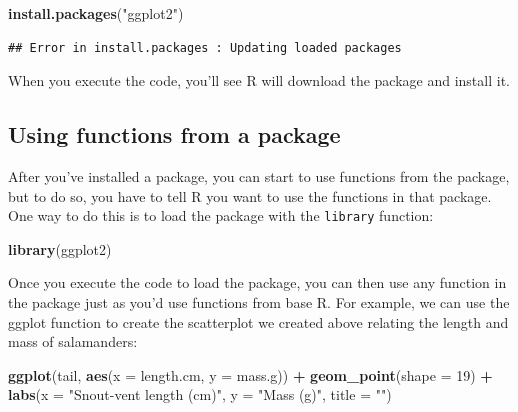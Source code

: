 \documentclass[
]{book}
\newenvironment{Shaded}{\begin{snugshade}}{\end{snugshade}}
\newcommand{\AttributeTok}[1]{\textcolor[rgb]{0.13,0.29,0.53}{#1}}
\newcommand{\DecValTok}[1]{\textcolor[rgb]{0.00,0.00,0.81}{#1}}
\newcommand{\FunctionTok}[1]{\textcolor[rgb]{0.13,0.29,0.53}{\textbf{#1}}}
\newcommand{\NormalTok}[1]{#1}
\newcommand{\SpecialCharTok}[1]{\textcolor[rgb]{0.81,0.36,0.00}{\textbf{#1}}}
\newcommand{\StringTok}[1]{\textcolor[rgb]{0.31,0.60,0.02}{#1}}
\begin{document}
\begin{Shaded}
\begin{Highlighting}[]
\FunctionTok{install.packages}\NormalTok{(}\StringTok{"ggplot2"}\NormalTok{)}
\end{Highlighting}
\end{Shaded}

\begin{verbatim}
## Error in install.packages : Updating loaded packages
\end{verbatim}

When you execute the code, you'll see R will download the package and install it.

\subsection{Using functions from a package}\label{using-functions-from-a-package}

After you've installed a package, you can start to use functions from the package, but to do so, you have to tell R you want to use the functions in that package. One way to do this is to load the package with the \texttt{library} function:

\begin{Shaded}
\begin{Highlighting}[]
\FunctionTok{library}\NormalTok{(ggplot2)}
\end{Highlighting}
\end{Shaded}

Once you execute the code to load the package, you can then use any function in the package just as you'd use functions from base R. For example, we can use the ggplot function to create the scatterplot we created above relating the length and mass of salamanders:

\begin{Shaded}
\begin{Highlighting}[]
\FunctionTok{ggplot}\NormalTok{(tail, }\FunctionTok{aes}\NormalTok{(}\AttributeTok{x =}\NormalTok{ length.cm, }\AttributeTok{y =}\NormalTok{ mass.g)) }\SpecialCharTok{+}
  \FunctionTok{geom\_point}\NormalTok{(}\AttributeTok{shape =} \DecValTok{19}\NormalTok{) }\SpecialCharTok{+}
  \FunctionTok{labs}\NormalTok{(}\AttributeTok{x =} \StringTok{"Snout{-}vent length (cm)"}\NormalTok{, }\AttributeTok{y =} \StringTok{"Mass (g)"}\NormalTok{, }\AttributeTok{title =} \StringTok{""}\NormalTok{)}
\end{Highlighting}
\end{Shaded}
\end{document}
